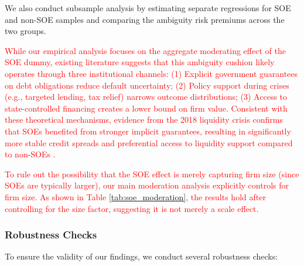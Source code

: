 \documentclass[preprint,12pt,authoryear]{elsarticle}
\begin{document}
We also conduct subsample analysis by estimating separate regressions for SOE and non-SOE samples and comparing the ambiguity risk premiums across the two groups.

\textcolor{red}{While our empirical analysis focuses on the aggregate moderating effect of the SOE dummy, existing literature suggests that this ambiguity cushion likely operates through three institutional channels: (1) Explicit government guarantees on debt obligations reduce default uncertainty; (2) Policy support during crises (e.g., targeted lending, tax relief) narrows outcome distributions; (3) Access to state-controlled financing creates a lower bound on firm value. Consistent with these theoretical mechanisms, evidence from the 2018 liquidity crisis confirms that SOEs benefited from stronger implicit guarantees, resulting in significantly more stable credit spreads and preferential access to liquidity support compared to non-SOEs \citep{Geng2024}.}

\textcolor{red}{To rule out the possibility that the SOE effect is merely capturing firm size (since SOEs are typically larger), our main moderation analysis explicitly controls for firm size. As shown in Table \ref{tab:soe_moderation}, the results hold after controlling for the size factor, suggesting it is not merely a scale effect.}

\subsubsection{Robustness Checks}
\label{sec:robustness}

To ensure the validity of our findings, we conduct several robustness checks:
\end{document}
